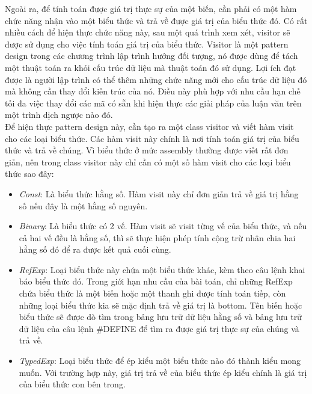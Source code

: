 Ngoài ra, để tính toán được giá trị thực sự của một biến, cần phải có một hàm chức năng nhận vào một biểu thức và trả về được giá trị của biểu thức đó. Có rất nhiều cách để hiện thực chức năng này, sau một quá trình xem xét, visitor sẽ được sử dụng cho việc tính toán giá trị của biểu thức. Visitor là một pattern design trong các chương trình lập trình hướng đối tượng, nó được dùng để tách một thuật toán ra khỏi cấu trúc dữ liệu mà thuật toán đó sử dụng. Lợi ích đạt được là người lập trình có thể thêm những chức năng mới cho cấu trúc dữ liệu đó mà không cần thay đổi kiến trúc của nó. Điều này phù hợp với nhu cầu hạn chế tối đa việc thay đổi các mã có sẵn khi hiện thực các giải pháp của luận văn trên một trình dịch ngược nào đó.\\

Để hiện thực pattern design này, cần tạo ra một class visitor và viết hàm visit cho các loại biểu thức. Các hàm visit này chính là nơi tính toán giá trị của biểu thức và trả về chúng. Vì biểu thức ở mức assembly thường được viết rất đơn giản, nên trong class visitor này chỉ cần có một số hàm visit cho các loại biểu thức sao đây:

\begin{itemize}
	\item \textit{Const}: Là biểu thức hằng số. Hàm visit này chỉ đơn giản trả về giá trị hằng số nếu đây là một hằng số nguyên.
	\item \textit{Binary}: Là biểu thức có 2 vế. Hàm visit sẽ visit từng vế của biểu thức, và nếu cả hai vế đều là hằng số, thì sẽ thực hiện phép tính cộng trừ nhân chia hai hằng số đó để ra được kết quả cuối cùng.
	\item \textit{RefExp}: Loại biểu thức này chứa một biểu thức khác, kèm theo câu lệnh khai báo biểu thức đó. Trong giới hạn nhu cầu của bài toán, chỉ những RefExp chứa biểu thức là một biến hoặc một thanh ghi được tính toán tiếp, còn những loại biểu thức kia sẽ mặc định trả về giá trị là bottom. Tên biến hoặc biểu thức sẽ được dò tìm trong bảng lưu trữ dữ liệu hằng số và bảng lưu trữ dữ liệu của câu lệnh \#DEFINE để tìm ra được giá trị thực sự của chúng và trả về.
	\item \textit{TypedExp}: Loại biểu thức để ép kiểu một biểu thức nào đó thành kiểu mong muốn. Với trường hợp này, giá trị trả về của biểu thức ép kiểu chính là giá trị của biểu thức con bên trong.
\end{itemize}


